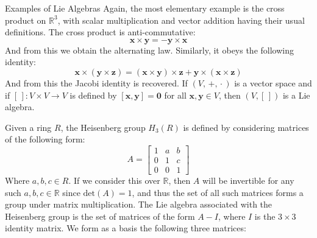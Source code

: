 \documentclass[crop=false,class=article]{standalone}                           %
\begin{document}
        \begin{lexample}{Examples of Lie Algebras}
            Again, the most elementary example is the cross product on
            $\mathbb{R}^{3}$, with scalar multiplication and vector addition
            having their usual definitions. The cross product is
            anti-commutative:
            \begin{equation}
                \mathbf{x}\times\mathbf{y}=\minus\mathbf{y}\times\mathbf{x}
            \end{equation}
            And from this we obtain the alternating law. Similarly, it obeys
            the following identity:
            \begin{equation}
                \mathbf{x}\times(\mathbf{y}\times\mathbf{z})=
                (\mathbf{x}\times\mathbf{y})\times\mathbf{z}+
                \mathbf{y}\times(\mathbf{x}\times\mathbf{z})
            \end{equation}
            And from this the Jacobi identity is recovered.
            If $(V,\,\boldsymbol{+},\,\boldsymbol{\cdot}\,)$ is a vector space
            and if $[\,]:V\times{V}\rightarrow{V}$ is defined by
            $[\mathbf{x},\mathbf{y}]=\mathbf{0}$ for all
            $\mathbf{x},\mathbf{y}\in{V}$, then $(V,[\,])$ is a Lie algebra.
            \par\hfill\par
            Given a ring $R$, the Heisenberg group $H_{3}(R)$ is defined by
            considering matrices of the following form:
            \begin{equation}
                A=\begin{bmatrix}
                    1&a&b\\
                    0&1&c\\
                    0&0&1
                \end{bmatrix}
            \end{equation}
            Where $a,b,c\in{R}$. If we consider this over $\mathbb{R}$, then
            $A$ will be invertible for any such $a,b,c\in\mathbb{R}$ since
            $\textrm{det}(A)=1$, and thus the set of all such matrices forms
            a group under matrix multiplication. The Lie algebra associated
            with the Heisenberg group is the set of matrices of the form
            $A-I$, where $I$ is the $3\times{3}$ identity matrix. We form as
            a basis the following three matrices:
            \par\hfill\par

\end{lexample}
\end{document}
